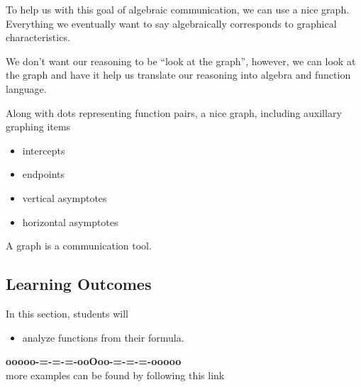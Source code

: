 \documentclass{ximera}
\begin{document}
To help us with this goal of algebraic communication, we can use a nice graph.  Everything we eventually want to say algebraically corresponds to graphical characteristics.

We don't want our reasoning to be ``look at the graph'', however, we can look at the graph and have it help us translate our reasoning into algebra and function language.





Along with dots representing function pairs, a nice graph, including auxillary graphing items
\begin{itemize}
	\item intercepts
	\item endpoints
	\item vertical asymptotes
	\item horizontal asymptotes
\end{itemize}





A graph is a communication tool.




\subsection*{Learning Outcomes}

\begin{sectionOutcomes}
In this section, students will 

\begin{itemize}
\item analyze functions from their formula.
\end{itemize}
\end{sectionOutcomes}










\begin{center}
\textbf{\textcolor{green!50!black}{ooooo-=-=-=-ooOoo-=-=-=-ooooo}} \\

more examples can be found by following this link\\ 

\end{center}
\end{document}
